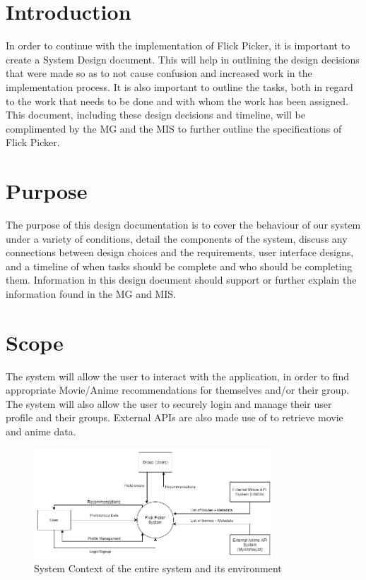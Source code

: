 \documentclass[12pt, titlepage]{article}
\begin{document}
\newpage

\tableofcontents

\newpage

\listoftables

\listoffigures

\newpage


\section{Introduction}
\hspace*{14pt} In order to continue with the implementation of Flick Picker, it is important to create a System Design document. This will help in outlining the design decisions that were made so as to not cause confusion and increased work in the implementation process. It is also important to outline the tasks, both in regard to the work that needs to be done and with whom the work has been assigned. This document, including these design decisions and timeline, will be complimented by the MG and the MIS to further outline the specifications of Flick Picker. 

\section{Purpose}
\hspace*{14pt} The purpose of this design documentation is to cover the behaviour of our system under a variety of conditions, detail the components of the system, discuss any connections between design choices and the requirements, user interface designs, and a timeline of when tasks should be complete and who should be completing them. Information in this design document should support or further explain the information found in the MG and MIS.

\section{Scope}

The system will allow the user to interact with the application, in order to find appropriate Movie/Anime recommendations for themselves and/or their group. The system will also allow the user to securely login and manage their user profile and their groups. External APIs are also made use of to retrieve movie and anime data.

\begin{figure}[H]
	\centering
	\includegraphics[width=0.8\textwidth]{SystemContext-rev1.png}
	\caption{System Context of the entire system and its environment}
	\label{FigUH}
\end{figure}
\end{document}
